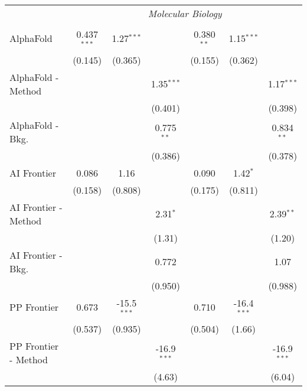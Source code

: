 \begin{tabular}{lcccccc}
 & \multicolumn{6}{c}{\textit{Molecular Biology}} \\ \\
   AlphaFold            & 0.437$^{***}$ & 1.27$^{***}$  &               & 0.380$^{**}$ & 1.15$^{***}$  &   \\   
                        & (0.145)       & (0.365)       &               & (0.155)      & (0.362)       &   \\   
   AlphaFold - Method   &               &               & 1.35$^{***}$  &              &               & 1.17$^{***}$\\   
                        &               &               & (0.401)       &              &               & (0.398)\\   
   AlphaFold - Bkg.     &               &               & 0.775$^{**}$  &              &               & 0.834$^{**}$\\   
                        &               &               & (0.386)       &              &               & (0.378)\\   
   AI Frontier          & 0.086         & 1.16          &               & 0.090        & 1.42$^{*}$    &   \\   
                        & (0.158)       & (0.808)       &               & (0.175)      & (0.811)       &   \\   
   AI Frontier - Method &               &               & 2.31$^{*}$    &              &               & 2.39$^{**}$\\   
                        &               &               & (1.31)        &              &               & (1.20)\\   
   AI Frontier - Bkg.   &               &               & 0.772         &              &               & 1.07\\   
                        &               &               & (0.950)       &              &               & (0.988)\\   
   PP Frontier          & 0.673         & -15.5$^{***}$ &               & 0.710        & -16.4$^{***}$ &   \\   
                        & (0.537)       & (0.935)       &               & (0.504)      & (1.66)        &   \\   
   PP Frontier - Method &               &               & -16.9$^{***}$ &              &               & -16.9$^{***}$\\   
                        &               &               & (4.63)        &              &               & (6.04)\\   

\end{tabular}
